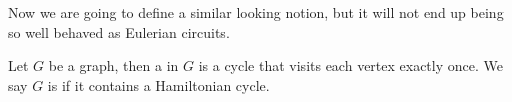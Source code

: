 \documentclass[a4paper]{scrreprt}
\begin{document}
Now we are going to define a similar looking notion, but it will not end up being so well behaved as Eulerian circuits. 

\begin{definition}
	Let $G$ be a graph, then a  in $G$ is a cycle that visits each vertex exactly once. We say $G$ is  if it contains a Hamiltonian cycle.
\end{definition}

\begin{center}
	


\begin{tikzpicture}[x=0.75pt,y=0.75pt,yscale=-1,xscale=1]


\end{tikzpicture}
\end{center}
\end{document}
